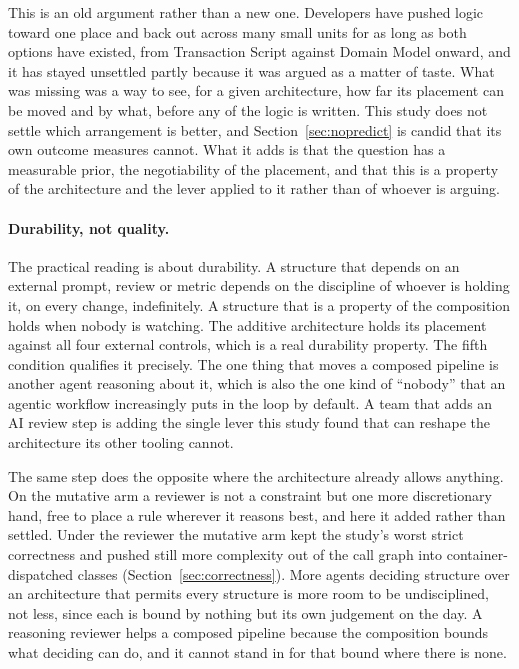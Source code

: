 \documentclass[11pt,a4paper]{article}
\begin{document}
This is an old argument rather than a new one. Developers have pushed logic toward
one place and back out across many small units for as long as both options have
existed, from Transaction Script against Domain Model \cite{fowler2002} onward,
and it has stayed unsettled partly because it was argued as a matter of taste.
What was missing was a way to see, for a given architecture, how far its placement
can be moved and by what, before any of the logic is written. This study does not
settle which arrangement is better, and Section~\ref{sec:nopredict} is candid that
its own outcome measures cannot. What it adds is that the question has a measurable
prior, the negotiability of the placement, and that this is a property of the
architecture and the lever applied to it rather than of whoever is arguing.

\paragraph{Durability, not quality.} The practical reading is about durability.
A structure that depends on an external prompt, review or metric depends on the
discipline of whoever is holding it, on every change, indefinitely. A structure
that is a property of the composition holds when nobody is watching. The additive
architecture holds its placement against all four external controls, which is a
real durability property. The fifth condition qualifies it precisely. The one
thing that moves a composed pipeline is another agent reasoning about it, which is
also the one kind of ``nobody'' that an agentic workflow increasingly puts in the
loop by default. A team that adds an AI review step is adding the single lever
this study found that can reshape the architecture its other tooling cannot.

The same step does the opposite where the architecture already allows anything.
On the mutative arm a reviewer is not a constraint but one more discretionary
hand, free to place a rule wherever it reasons best, and here it added rather than
settled. Under the reviewer the mutative arm kept the study's worst strict
correctness and pushed still more complexity out of the call graph into
container-dispatched classes (Section~\ref{sec:correctness}). More agents deciding
structure over an architecture that permits every structure is more room to be
undisciplined, not less, since each is bound by nothing but its own judgement on
the day. A reasoning reviewer helps a composed pipeline because the composition
bounds what deciding can do, and it cannot stand in for that bound where there is
none.
\end{document}
